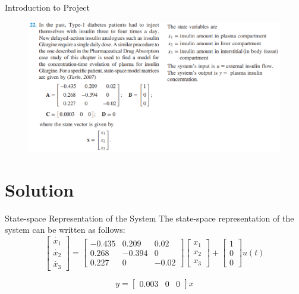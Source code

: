 \documentclass[10pt,compress,mathserif]{beamer}
\begin{document}
\begin{frame}{Introduction to Project}
	\begin{figure}[h!]
		\centering
		\includegraphics[scale=0.6]{images/Problem22.png}
		\caption{}
	\end{figure}
\end{frame}

\section{Solution}
\begin{frame}{State-space Representation of the System}
The state-space representation of the system can be written as follows:\begin{equation}
\begin{bmatrix} \dot{x_1}\\  \dot{x_2}\\ \dot{x_3} \end{bmatrix}
= \begin{bmatrix}
-0.435 & 0.209 & 0.02\\
0.268 & -0.394 & 0\\
0.227 & 0 & -0.02\end{bmatrix}
\begin{bmatrix} x_1\\  x_2 \\ x_3 \end{bmatrix} +
\begin{bmatrix}
1 \\
0 \\
0 \end{bmatrix}
u(t)
\end{equation}

\begin{equation}
y=\begin{bmatrix}
0.003 & 0 & 0
\end{bmatrix}x
\end{equation}

\end{frame}
\end{document}
